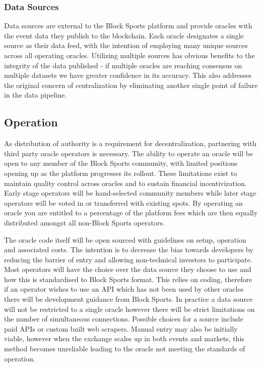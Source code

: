 \documentclass{article}
\begin{document}
		\subsubsection{Data Sources}
Data sources are external to the Block Sports platform and provide oracles with the event data they publish to the blockchain. Each oracle designates a single source as their data feed, with the intention of employing many unique sources across all operating oracles. Utilizing multiple sources has obvious benefits to the integrity of the data published - if multiple oracles are reaching consensus on multiple datasets we have greater confidence in its accuracy. This also addresses the original concern of centralization by eliminating another single point of failure in the data pipeline.

	\subsection{Operation}
As distribution of authority is a requirement for decentralization, partnering with third party oracle operators is necessary. The ability to operate an oracle will be open to any member of the Block Sports community, with limited positions opening up as the platform progresses its rollout. These limitations exist to maintain quality control across oracles and to sustain financial incentivization. Early stage operators will be hand-selected community members while later stage operators will be voted in or transferred with existing spots. By operating an oracle you are entitled to a percentage of the platform fees which are then equally distributed amongst all non-Block Sports operators.

The oracle code itself will be open sourced with guidelines on setup, operation and associated costs. The intention is to decrease the bias towards developers by reducing the barrier of entry and allowing non-technical investors to participate. Most operators will have the choice over the data source they choose to use and how this is standardised to Block Sports format. This relies on coding, therefore if an operator wishes to use an API which has not been used by other oracles there will be development guidance from Block Sports. In practice a data source will not be restricted to a single oracle however there will be strict limitations on the number of simultaneous connections. Possible choices for a source include paid APIs or custom built web scrapers. Manual entry may also be initially viable, however when the exchange scales up in both events and markets, this method becomes unreliable leading to the oracle not meeting the standards of operation.
\end{document}
